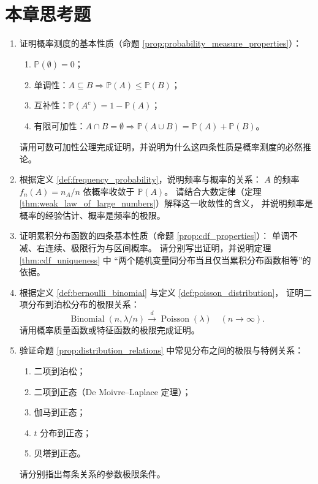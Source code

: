 \section*{本章思考题}

\begin{enumerate}[leftmargin=3em, label=\textbf{题 \arabic*}]
    \item 证明概率测度的基本性质（命题 \ref{prop:probability_measure_properties}）：
    \begin{enumerate}[label=(\roman*)]
        \item $\mathbb{P}(\emptyset)=0$；
        \item 单调性：$A\subseteq B\Rightarrow\mathbb{P}(A)\le\mathbb{P}(B)$；
        \item 互补性：$\mathbb{P}(A^c)=1-\mathbb{P}(A)$；
        \item 有限可加性：$A\cap B=\emptyset\Rightarrow\mathbb{P}(A\cup B)=\mathbb{P}(A)+\mathbb{P}(B)$。
    \end{enumerate}
    请用可数可加性公理完成证明，并说明为什么这四条性质是概率测度的必然推论。

    \item 根据定义 \ref{def:frequency_probability}，说明频率与概率的关系：
    $A$ 的频率 $f_n(A)=n_A/n$ 依概率收敛于 $\mathbb{P}(A)$。
    请结合大数定律（定理 \ref{thm:weak_law_of_large_numbers}）解释这一收敛性的含义，
    并说明频率是概率的经验估计、概率是频率的极限。

    \item 证明累积分布函数的四条基本性质（命题 \ref{prop:cdf_properties}）：
    单调不减、右连续、极限行为与区间概率。
    请分别写出证明，并说明定理 \ref{thm:cdf_uniqueness} 中
    “两个随机变量同分布当且仅当累积分布函数相等”的依据。

    \item 根据定义 \ref{def:bernoulli_binomial} 与定义 \ref{def:poisson_distribution}，
    证明二项分布到泊松分布的极限关系：
    \[
    \operatorname{Binomial}(n,\lambda/n)\xrightarrow{d}\operatorname{Poisson}(\lambda)
    \quad(n\to\infty).
    \]
    请用概率质量函数或特征函数的极限完成证明。

    \item 验证命题 \ref{prop:distribution_relations} 中常见分布之间的极限与特例关系：
    \begin{enumerate}[label=(\roman*)]
        \item 二项到泊松；
        \item 二项到正态（De Moivre--Laplace 定理）；
        \item 伽马到正态；
        \item $t$ 分布到正态；
        \item 贝塔到正态。
    \end{enumerate}
    请分别指出每条关系的参数极限条件。


\end{enumerate}
